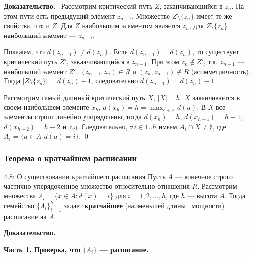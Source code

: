 \documentclass[a4paper,12pt]{article}
\newcommand{\myproof}{\textbf{Доказательство.}\ }
\begin{document}
	\myproof
	Рассмотрим критический путь $Z$, заканчивающийся в $z_n$. На этом пути есть предыдущий элемент $z_{n-1}$. Множество $Z \setminus \{z_n\}$ имеет те же свойства, что и $Z$. Для $Z$ наибольшим элементом является $z_n$, для $Z \setminus \{z_n\}$ наибольший элемент — $z_{n-1}$.
	
	Покажем, что $d(z_{n-1}) \neq d(z_n)$. Если $d(z_{n-1}) = d(z_n)$, то существует критический путь $Z'$, заканчивающийся в $z_{n-1}$. При этом $z_n \notin Z'$, т.к. $z_{n-1}$ — наибольший элемент $Z'$, $(z_{n-1}, z_n) \in R$ и $(z_n, z_{n-1}) \notin R$ (асимметричность). Тогда $|Z \setminus \{z_n\}| = d(z_n) - 1$, следовательно $d(z_{n-1}) = d(z_n) - 1$.
	
	Рассмотрим самый длинный критический путь $X$, $|X| = h$. $X$ заканчивается в своем наибольшем элементе $x_h$, $d(x_h) = h = \max_{a \in A} d(a)$. В $X$ все элементы строго линейно упорядочены, тогда $d(x_h) = h$, $d(x_{h-1}) = h-1$, $d(x_{h-2}) = h-2$ и т.д. Следовательно, $\forall i \in 1..h$ имеем $A_i \cap X \neq \emptyset$, где $A_i = \{a \in A : d(a) = i\}$. \qed
	
	\subsubsection{Теорема о кратчайшем расписании}
	
	\begin{theorembox}{4.8: О существовании кратчайшего расписания}
		Пусть $A$ — конечное строго частично упорядоченное множество относительно отношения $R$. 
		Рассмотрим множества $A_i = \{ x \in A : d(x) = i \}$ для $i = 1, 2, \dots, h$, где $h$ — высота $A$.
		Тогда семейство $\{A_i\}_{i=1}^{h}$ задает \textbf{кратчайшее} (наименьшей длины \ мощности) расписание на $A$.
	\end{theorembox}
	
	\myproof
	
	\textbf{Часть 1. Проверка, что $\{A_i\}$ — расписание.}
	
\end{document}
